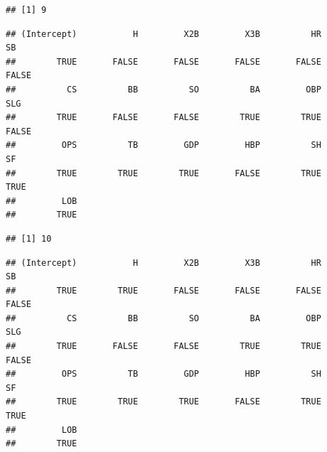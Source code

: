 \documentclass[
  11pt,
]{book}
\newenvironment{Shaded}{\begin{snugshade}}{\end{snugshade}}
\newcommand{\CommentTok}[1]{\textcolor[rgb]{0.56,0.35,0.01}{\textit{#1}}}
\newcommand{\FunctionTok}[1]{\textcolor[rgb]{0.00,0.00,0.00}{#1}}
\newcommand{\NormalTok}[1]{#1}
\newcommand{\SpecialCharTok}[1]{\textcolor[rgb]{0.00,0.00,0.00}{#1}}
\theoremstyle{definition}
\theoremstyle{definition}
\theoremstyle{definition}
\theoremstyle{definition}
\theoremstyle{remark}
\begin{document}
\begin{verbatim}
## [1] 9
\end{verbatim}

\begin{Shaded}
\end{Shaded}

\begin{verbatim}
## (Intercept)           H         X2B         X3B          HR          SB 
##        TRUE       FALSE       FALSE       FALSE       FALSE       FALSE 
##          CS          BB          SO          BA         OBP         SLG 
##        TRUE       FALSE       FALSE        TRUE        TRUE       FALSE 
##         OPS          TB         GDP         HBP          SH          SF 
##        TRUE        TRUE        TRUE       FALSE        TRUE        TRUE 
##         LOB 
##        TRUE
\end{verbatim}

\begin{Shaded}
\end{Shaded}

\begin{verbatim}
## [1] 10
\end{verbatim}

\begin{Shaded}
\end{Shaded}

\begin{verbatim}
## (Intercept)           H         X2B         X3B          HR          SB 
##        TRUE        TRUE       FALSE       FALSE       FALSE       FALSE 
##          CS          BB          SO          BA         OBP         SLG 
##        TRUE       FALSE       FALSE        TRUE        TRUE       FALSE 
##         OPS          TB         GDP         HBP          SH          SF 
##        TRUE        TRUE        TRUE       FALSE        TRUE        TRUE 
##         LOB 
##        TRUE
\end{verbatim}
\end{document}
